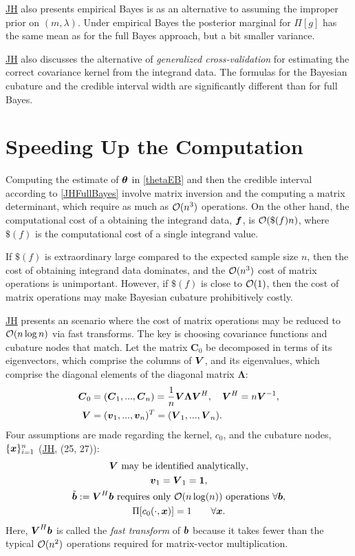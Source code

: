 \documentclass[sts]{imsart}
\numberwithin{equation}{section}
\theoremstyle{plain}
\newcommand{\vC}{\boldsymbol{C}}
\newcommand{\JH}{\hyperlink{RatHic18a}{JH}\xspace}
\newcommand{\vLambda}{\boldsymbol{\Lambda}}
\begin{document}
\JH also presents empirical Bayes is as an alternative to assuming the improper prior on $(m,\lambda)$.  Under empirical Bayes the posterior marginal for $\Pi[g]$ has the same mean as for the full Bayes approach, but a bit smaller variance.  

\JH also discusses the alternative of \emph{generalized cross-validation} for estimating the correct covariance kernel from the integrand data.  The formulas for the Bayesian cubature and the credible interval width are significantly different than for full Bayes.


\section{Speeding Up the Computation} \label{sec:Match}
Computing the estimate of $\boldsymbol{\theta}$ in \eqref{thetaEB} and then the credible interval according to \eqref{JHFullBayes} involve matrix inversion and the computing a matrix determinant, which require as much as $\operatorname{{\mathcal O}}(n^3)$ operations.  On the other hand, the computational cost of a obtaining the integrand data, $\boldsymbol{f}$, is $\operatorname{{\mathcal O}}(\$(f)n)$, where $\$(f)$ is the computational cost of  a single integrand value.

If $\$(f)$ is extraordinary large compared to the expected sample size $n$, then the cost of obtaining integrand data dominates, and the $\operatorname{{\mathcal O}}(n^3)$ cost of matrix operations is unimportant.  However, if $\$(f)$ is close to $\operatorname{{\mathcal O}}(1)$, then the cost of matrix operations may make Bayesian cubature prohibitively costly.

\JH presents an scenario where the cost of matrix operations may be reduced to $\operatorname{{\mathcal O}}(n \log n)$ via fast transforms.  The key is choosing covariance functions and cubature nodes that match.  Let the matrix $\vC_0$ be decomposed in terms of its eigenvectors, which comprise the columns of $\boldsymbol{V}$, and its eigenvalues, which comprise the diagonal elements of the diagonal matrix $\vLambda$:
\begin{align}
\nonumber
\vC_0 &  = (\vC_1,...,\vC_n) 
= \frac 1n \vV \vLambda \vV^H , 
\quad \vV^H = n \vV^{-1}, \\
\nonumber
\vV &= (\vv_1,...,\vv_n)^T = (\vV_1,...,\vV_n).
\end{align}
Four assumptions are made regarding the kernel, $c_0$, and the cubature nodes, $\{\boldsymbol{x}\}_{i=1}^n$ (\JH, (25, 27)):
\begin{subequations} \label{fastcompAssump}
	\begin{gather}
	\label{fastcompAssumpA}
	\vV \text{ may be identified analytically}, \\
	\label{fastcompAssumpB}
	\vv_1 = \vV_1 = \vone, \\
	\label{fastcompAssumpC}
	\tilde{\vb}:=\vV^H \vb  \text{ requires only $\Order(n \log(n))$ operations } \forall \vb, \\
	\Pi[c_0(\cdot,\vx)] = 1 \qquad \forall \vx.
	\end{gather}
\end{subequations}
Here, $\boldsymbol{V}^H \boldsymbol{b}$ is called the \emph{fast transform} of $\boldsymbol{b}$ because it takes fewer than the typical $\operatorname{{\mathcal O}}(n^2)$ operations required for matrix-vector multiplication.
\end{document}
